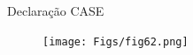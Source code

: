 \documentclass[aspectratio=169]{beamer}
\begin{document}
\begin{frame}{Declaração CASE}
	\justifying
	
	
%		
	
	\begin{figure}[h]
		\centering
		\texttt{[image: Figs/fig62.png]}
	\end{figure}
	
	
	
\end{frame}

%	
%	
%	
%	
%	
%	
%	
%	
%	
%	
\end{document}

